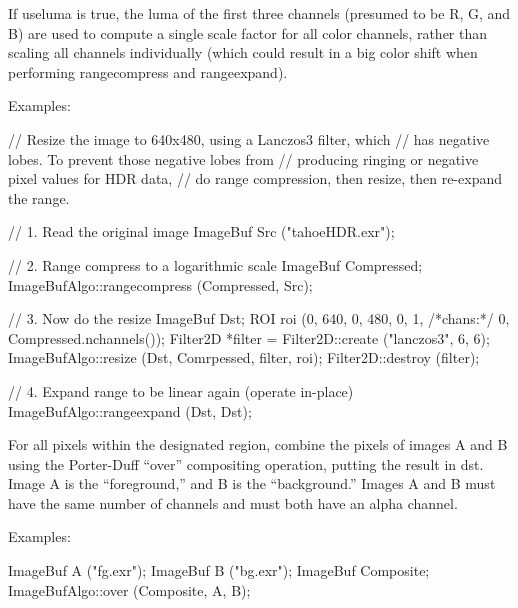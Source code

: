 If {\cf useluma} is true, the luma of the first three channels (presumed
to be R, G, and B) are used to compute a single scale factor for all
color channels, rather than scaling all channels individually (which
could result in a big color shift when performing {\cf rangecompress}
and {\cf rangeexpand}).

\smallskip
\noindent Examples:
\begin{code}
    // Resize the image to 640x480, using a Lanczos3 filter, which
    // has negative lobes. To prevent those negative lobes from
    // producing ringing or negative pixel values for HDR data,
    // do range compression, then resize, then re-expand the range.

    // 1. Read the original image
    ImageBuf Src ("tahoeHDR.exr");

    // 2. Range compress to a logarithmic scale
    ImageBuf Compressed;
    ImageBufAlgo::rangecompress (Compressed, Src);

    // 3. Now do the resize
    ImageBuf Dst;
    ROI roi (0, 640, 0, 480, 0, 1, /*chans:*/ 0, Compressed.nchannels());
    Filter2D *filter = Filter2D::create ("lanczos3", 6, 6);
    ImageBufAlgo::resize (Dst, Comrpessed, filter, roi);
    Filter2D::destroy (filter);

    // 4. Expand range to be linear again (operate in-place)
    ImageBufAlgo::rangeexpand (Dst, Dst);
\end{code}
\apiend


 

For all pixels within the designated region, combine the pixels of
images {\cf A} and {\cf B} using the Porter-Duff ``over'' compositing
operation, putting the result in {\cf dst}.  Image {\cf A} is the
``foreground,'' and {\cf B} is the ``background.''  Images {\cf A} and
{\cf B} must have the same number of channels and must both have an
alpha channel.

\smallskip
\noindent Examples:
\begin{code}
    ImageBuf A ("fg.exr");
    ImageBuf B ("bg.exr");
    ImageBuf Composite;
    ImageBufAlgo::over (Composite, A, B);
\end{code}
\apiend


 

